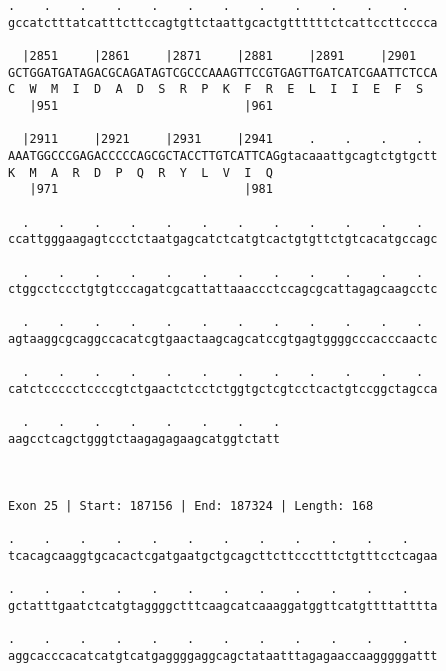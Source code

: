 \documentclass{article}
\begin{document}
\begin{Verbatim}
.    .    .    .    .    .    .    .    .    .    .    .    
gccatctttatcatttcttccagtgttctaattgcactgttttttctcattccttcccca
                                                            
  |2851     |2861     |2871     |2881     |2891     |2901   
GCTGGATGATAGACGCAGATAGTCGCCCAAAGTTCCGTGAGTTGATCATCGAATTCTCCA
C  W  M  I  D  A  D  S  R  P  K  F  R  E  L  I  I  E  F  S  
   |951                          |961                       
  
  |2911     |2921     |2931     |2941     .    .    .    .  
AAATGGCCCGAGACCCCCAGCGCTACCTTGTCATTCAGgtacaaattgcagtctgtgctt
K  M  A  R  D  P  Q  R  Y  L  V  I  Q                       
   |971                          |981                       
  
  .    .    .    .    .    .    .    .    .    .    .    .  
ccattgggaagagtccctctaatgagcatctcatgtcactgtgttctgtcacatgccagc
                                                            
  .    .    .    .    .    .    .    .    .    .    .    .  
ctggcctccctgtgtcccagatcgcattattaaaccctccagcgcattagagcaagcctc
                                                            
  .    .    .    .    .    .    .    .    .    .    .    .  
agtaaggcgcaggccacatcgtgaactaagcagcatccgtgagtggggcccacccaactc
                                                            
  .    .    .    .    .    .    .    .    .    .    .    .  
catctccccctccccgtctgaactctcctctggtgctcgtcctcactgtccggctagcca
                                                            
  .    .    .    .    .    .    .    .
aagcctcagctgggtctaagagagaagcatggtctatt
                                      
                                      
 
Exon 25 | Start: 187156 | End: 187324 | Length: 168
 
.    .    .    .    .    .    .    .    .    .    .    .    
tcacagcaaggtgcacactcgatgaatgctgcagcttcttccctttctgtttcctcagaa
                                                            
.    .    .    .    .    .    .    .    .    .    .    .    
gctatttgaatctcatgtaggggctttcaagcatcaaaggatggttcatgttttatttta
                                                            
.    .    .    .    .    .    .    .    .    .    .    .    
aggcacccacatcatgtcatgaggggaggcagctataatttagagaaccaagggggattt
                                                            

\end{Verbatim}
\end{document}

